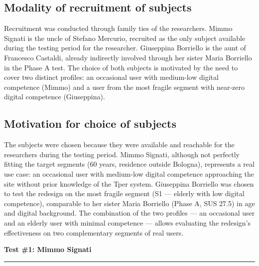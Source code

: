 ﻿\documentclass[11pt,a4paper]{article}
\begin{document}
\subsection*{Modality of recruitment of subjects}
\begin{tcolorbox}[base]
Recruitment was conducted through family ties of the
researchers. Mimmo Signati is the uncle of Stefano Mercurio,
recruited as the only subject available during the
testing period for the researcher. Giuseppina Borriello is the aunt of
Francesco Castaldi, already indirectly involved through
her sister Maria Borriello in the Phase A test. The choice of
both subjects is motivated by the need to cover
two distinct profiles: an occasional user with medium-low digital
competence (Mimmo) and a user from the most fragile
segment with near-zero digital competence (Giuseppina).
\end{tcolorbox}

\vspace{0.2cm}

\subsection*{Motivation for choice of subjects}
\begin{tcolorbox}[base]
The subjects were chosen because they were available and
reachable for the researchers during the testing period.
Mimmo Signati, although not perfectly fitting the
target segments (60 years, residence outside Bologna),
represents a real use case: an occasional user
with medium-low digital competence approaching the
site without prior knowledge of the Tper system.
Giuseppina Borriello was chosen to test the
redesign on the most fragile segment (S1 --- elderly with
low digital competence), comparable to her sister
Maria Borriello (Phase A, SUS 27.5) in age and digital
background. The combination of the two profiles --- an occasional
user and an elderly user with minimal competence ---
allows evaluating the redesign's effectiveness on two
complementary segments of real users.
\end{tcolorbox}


\newpage
\begin{center}
  {\color{primaryColor}\large\bfseries Test \#1: Mimmo Signati}\\
  \vspace{0.1cm}
  \color{borderColor}\hrule
\end{center}
\end{document}
